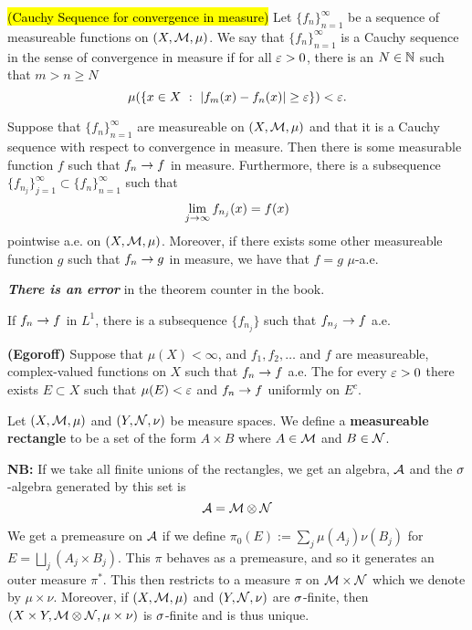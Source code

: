 \vs

\dfn \hl{(Cauchy Sequence for convergence in measure)} Let $\{f_n\}_{n = 1}^\infty$ be a sequence of measureable functions on $(X, \mathcal{M}, \mu)$. We say that $\{f_n\}_{n = 1}^\infty$ is a Cauchy sequence in the sense of convergence in measure if for all $\varepsilon > 0$, there is an $N\in\mathbb{N}$ such that $m > n \geq N$
\[\mu(\{x\in X\ :\ |f_m(x) - f_n(x)|\geq \varepsilon\}) < \varepsilon.\]

\vs

\begin{thm}
Suppose that $\{f_n\}_{n = 1}^\infty$ are measureable on $(X, \mathcal{M}, \mu)$ and that it is a Cauchy sequence with respect to convergence in measure. Then there is some measurable function $f$ such that $f_n \rightarrow f$ in measure. Furthermore, there is a subsequence $\{f_{n_j}\}_{j = 1}^\infty \subset \{f_n\}_{n = 1}^\infty$ such that 
\[\lim_{j\rightarrow \infty} f_{n_j}(x) = f(x)\]
pointwise a.e. on $(X, \mathcal{M}, \mu)$. Moreover, if there exists some other measureable function $g$ such that $f_n \rightarrow g$ in measure, we have that $f = g$ $\mu$-a.e.
\end{thm}

\vs

\textbf{\textit{There is an error}} in the theorem counter in the book.

\vs
\setcounter{thm}{31}

\begin{cor}
If $f_n \rightarrow f$ in $L^1$, there is a subsequence $\{f_{n_j}\}$ such that $f_{n_j} \rightarrow f$ a.e.
\end{cor}


\vs


\begin{thm}\textbf{(Egoroff)}
Suppose that $\mu(X) < \infty$, and $f_1, f_2, \ldots$ and $f$ are measureable, complex-valued functions on $X$ such that $f_n \rightarrow f$ a.e. The for every $\varepsilon > 0$ there exists $E \subset X$ such that $\mu(E) < \varepsilon$ and $f_n \rightarrow f$ uniformly on $E^c$.
\end{thm}

\vs

\dfn Let $(X, \mathcal{M}, \mu)$ and $(Y, \mathcal{N}, \nu)$ be measure spaces. We define a \textbf{measureable rectangle} to be a set of the form $A\times B$ where $A\in \mathcal{M}$ and $B\in \mathcal{N}$. 

\textbf{NB:} If we take all finite unions of the rectangles, we get an algebra, $\mathcal{A}$ and the $\sigma$-algebra generated by this set is 
\[\mathcal{A} = \mathcal{M}\otimes \mathcal{N}\]

We get a premeasure on $\mathcal{A}$ if we define $\pi_0(E) := \sum_j \mu(A_j)\nu(B_j)$ for $E = \bigsqcup_j (A_j \times B_j)$. This $\pi$ behaves as a premeasure, and so it generates an outer measure $\pi^*$. This then restricts to a measure $\pi$ on $\mathcal{M}\times \mathcal{N}$ which we denote by $\mu\times \nu$. Moreover, if $(X, \mathcal{M}, \mu)$ and $(Y, \mathcal{N}, \nu)$ are $\sigma$-finite, then $(X\times Y, \mathcal{M}\otimes \mathcal{N}, \mu \times \nu)$ is $\sigma$-finite and is thus unique.

